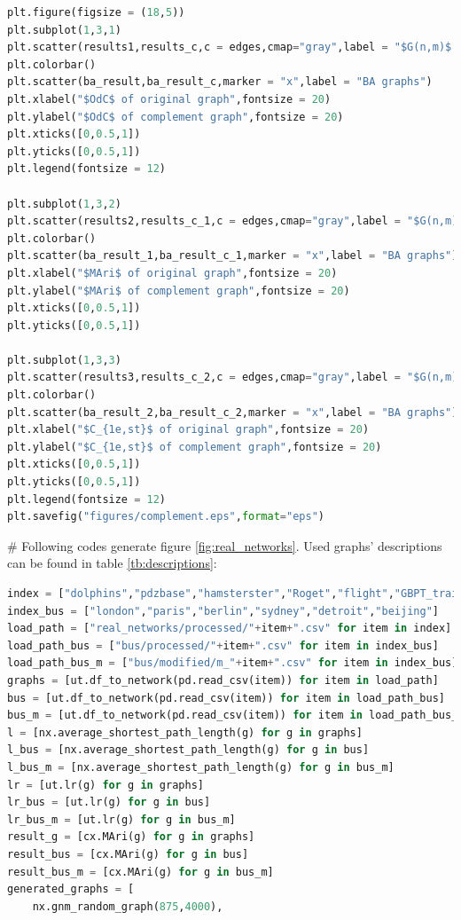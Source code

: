 \documentclass[12pt]{article}
\begin{document}
{\begin{lstlisting}[breaklines=true,language=Python]
plt.figure(figsize = (18,5))
plt.subplot(1,3,1)
plt.scatter(results1,results_c,c = edges,cmap="gray",label = "$G(n,m)$ random graphs")
plt.colorbar()
plt.scatter(ba_result,ba_result_c,marker = "x",label = "BA graphs")
plt.xlabel("$OdC$ of original graph",fontsize = 20)
plt.ylabel("$OdC$ of complement graph",fontsize = 20)
plt.xticks([0,0.5,1])
plt.yticks([0,0.5,1])
plt.legend(fontsize = 12)

plt.subplot(1,3,2)
plt.scatter(results2,results_c_1,c = edges,cmap="gray",label = "$G(n,m)$ random graphs")
plt.colorbar()
plt.scatter(ba_result_1,ba_result_c_1,marker = "x",label = "BA graphs")
plt.xlabel("$MAri$ of original graph",fontsize = 20)
plt.ylabel("$MAri$ of complement graph",fontsize = 20)
plt.xticks([0,0.5,1])
plt.yticks([0,0.5,1])

plt.subplot(1,3,3)
plt.scatter(results3,results_c_2,c = edges,cmap="gray",label = "$G(n,m)$ random graphs")
plt.colorbar()
plt.scatter(ba_result_2,ba_result_c_2,marker = "x",label = "BA graphs")
plt.xlabel("$C_{1e,st}$ of original graph",fontsize = 20)
plt.ylabel("$C_{1e,st}$ of complement graph",fontsize = 20)
plt.xticks([0,0.5,1])
plt.yticks([0,0.5,1])
plt.legend(fontsize = 12)
plt.savefig("figures/complement.eps",format="eps")
\end{lstlisting}
\noindent
\newline
\# Following codes generate figure \ref{fig:real_networks}. Used graphs' descriptions can be found in table \ref{tb:descriptions}:
\begin{lstlisting}[breaklines=true,language=Python]
index = ["dolphins","pdzbase","hamsterster","Roget","flight","GBPT_train"]
index_bus = ["london","paris","berlin","sydney","detroit","beijing"]
load_path = ["real_networks/processed/"+item+".csv" for item in index]
load_path_bus = ["bus/processed/"+item+".csv" for item in index_bus]
load_path_bus_m = ["bus/modified/m_"+item+".csv" for item in index_bus]
graphs = [ut.df_to_network(pd.read_csv(item)) for item in load_path]
bus = [ut.df_to_network(pd.read_csv(item)) for item in load_path_bus]
bus_m = [ut.df_to_network(pd.read_csv(item)) for item in load_path_bus_m]
l = [nx.average_shortest_path_length(g) for g in graphs]       
l_bus = [nx.average_shortest_path_length(g) for g in bus]
l_bus_m = [nx.average_shortest_path_length(g) for g in bus_m]
lr = [ut.lr(g) for g in graphs]
lr_bus = [ut.lr(g) for g in bus]
lr_bus_m = [ut.lr(g) for g in bus_m]
result_g = [cx.MAri(g) for g in graphs]
result_bus = [cx.MAri(g) for g in bus]
result_bus_m = [cx.MAri(g) for g in bus_m]
generated_graphs = [
    nx.gnm_random_graph(875,4000),

\end{lstlisting}}
\end{document}
